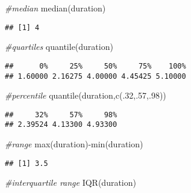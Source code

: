 \documentclass[
]{article}
\newenvironment{Shaded}{\begin{snugshade}}{\end{snugshade}}
\newcommand{\CommentTok}[1]{\textcolor[rgb]{0.56,0.35,0.01}{\textit{#1}}}
\newcommand{\DecValTok}[1]{\textcolor[rgb]{0.00,0.00,0.81}{#1}}
\newcommand{\FunctionTok}[1]{\textcolor[rgb]{0.00,0.00,0.00}{#1}}
\newcommand{\NormalTok}[1]{#1}
\newcommand{\SpecialCharTok}[1]{\textcolor[rgb]{0.00,0.00,0.00}{#1}}
\begin{document}
\begin{Shaded}
\begin{Highlighting}[]
\CommentTok{\#median}
\FunctionTok{median}\NormalTok{(duration)}
\end{Highlighting}
\end{Shaded}

\begin{verbatim}
## [1] 4
\end{verbatim}

\begin{Shaded}
\begin{Highlighting}[]
\CommentTok{\#quartiles}
\FunctionTok{quantile}\NormalTok{(duration)}
\end{Highlighting}
\end{Shaded}

\begin{verbatim}
##      0%     25%     50%     75%    100% 
## 1.60000 2.16275 4.00000 4.45425 5.10000
\end{verbatim}

\begin{Shaded}
\begin{Highlighting}[]
\CommentTok{\#percentile}
\FunctionTok{quantile}\NormalTok{(duration,}\FunctionTok{c}\NormalTok{(.}\DecValTok{32}\NormalTok{,.}\DecValTok{57}\NormalTok{,.}\DecValTok{98}\NormalTok{))}
\end{Highlighting}
\end{Shaded}

\begin{verbatim}
##     32%     57%     98% 
## 2.39524 4.13300 4.93300
\end{verbatim}

\begin{Shaded}
\begin{Highlighting}[]
\CommentTok{\#range}
\FunctionTok{max}\NormalTok{(duration)}\SpecialCharTok{{-}}\FunctionTok{min}\NormalTok{(duration)}
\end{Highlighting}
\end{Shaded}

\begin{verbatim}
## [1] 3.5
\end{verbatim}

\begin{Shaded}
\begin{Highlighting}[]
\CommentTok{\#interquartile range}
\FunctionTok{IQR}\NormalTok{(duration)}
\end{Highlighting}
\end{Shaded}
\end{document}

